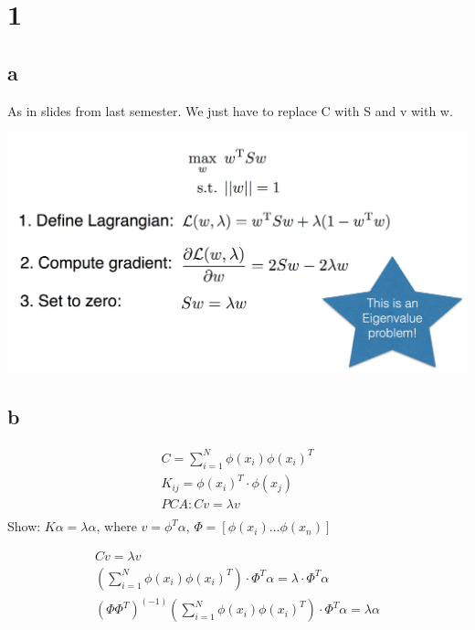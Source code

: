 \section*{1}

\subsection*{a}
As in slides from last semester.
We just have to replace C with S and v with w.

\includegraphics[scale=0.3]{1aEx6.png}

\subsection*{b}
\begin{gather*}
C = \sum_{i=1}^N \phi (x_i) \phi (x_i)^T \\
K_{ij} = \phi (x_i)^T \cdot \phi (x_j) \\
PCA: C v = \lambda v \\ 
\end{gather*}
Show: $K \alpha = \lambda \alpha$, where $v = \phi^T \alpha$, $\Phi = [\phi(x_i) ... \phi(x_n)]$

\begin{gather*}
C v = \lambda v \\
(\sum_{i=1}^N \phi(x_i) \phi(x_i)^T) \cdot \Phi^T \alpha = \lambda \cdot \Phi^T \alpha \\
(\Phi \Phi^T)^{(-1)} (\sum_{i=1}^N \phi (x_i) \phi (x_i)^T) \cdot \Phi^T \alpha = \lambda \alpha \\
\end{gather*}


